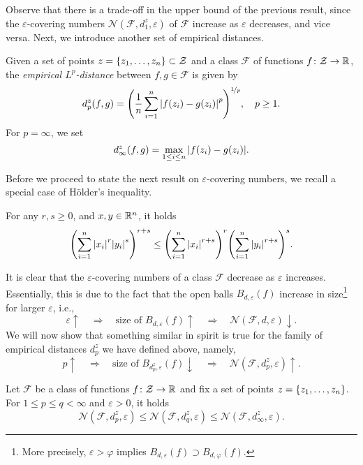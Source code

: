 Observe that there is a trade-off in the upper bound of the previous result, since the $\varepsilon$-covering numbers $\mathcal{N}(\mathcal{F}, d_1^z, \varepsilon)$ of $\mathcal{F}$ increase as $\varepsilon$ decreases, and vice versa. Next, we introduce another set of empirical distances.

\begin{definition}
Given a set of points $z = \set{z_1, \dots, z_n} \subset \mathcal{Z}$ and a class $\mathcal{F}$ of functions $f \colon \mathcal{Z} \to \mathbb{R}$, the \emph{empirical $L^p$-distance} between $f, g \in \mathcal{F}$ is given by
\[
    d_p^z(f, g) = \left(\frac{1}{n} \sum_{i=1}^n \abs{f(z_i) - g(z_i)}^p \right)^{\nicefrac{1}{p}}, \quad p \geq 1.
\]
For $p = \infty$, we set
\[
    d_{\infty}^z(f, g) = \max_{1 \leq i \leq n} \abs{f(z_i) - g(z_i)}.
\]
\end{definition}

Before we proceed to state the next result on $\varepsilon$-covering numbers, we recall a special case of H{\"o}lder's inequality.

\begin{proposition}[H{\"o}lder, 1889]
\label{prop: hoelder}
For any $r, s \geq 0$, and $x, y \in \mathbb{R}^n$, it holds
\[
    \left(\sum_{i=1}^n \abs{x_i}^r \abs{y_i}^s \right)^{r+s} \leq \left(\sum_{i=1}^n \abs{x_i}^{r+s}\right)^r \left(\sum_{i=1}^n \abs{y_i}^{r+s}\right)^s.
\]
\end{proposition}

It is clear that the $\varepsilon$-covering numbers of a class $\mathcal{F}$ decrease as $\varepsilon$ increases. Essentially, this is due to the fact that the open balls $B_{d, \varepsilon}(f)$ increase in size\footnote{More precisely, $\varepsilon > \varphi$ implies $B_{d, \varepsilon}(f) \supset B_{d, \varphi}(f)$.} for larger $\varepsilon$, i.e.,
\[
    \varepsilon \uparrow \quad \Rightarrow \quad \text{size of } B_{d, \varepsilon}(f) \uparrow \quad \Rightarrow \quad \mathcal{N}(\mathcal{F}, d, \varepsilon) \downarrow.
\]
We will now show that something similar in spirit is true for the family of empirical distances $d_p^z$ we have defined above, namely,
\[
    p \uparrow \quad \Rightarrow \quad \text{size of } B_{d_p^z, \varepsilon}(f) \downarrow \quad \Rightarrow \quad \mathcal{N}(\mathcal{F}, d_p^z, \varepsilon) \uparrow.
\]

\begin{proposition}
Let $\mathcal{F}$ be a class of functions $f \colon \mathcal{Z} \to \mathbb{R}$ and fix a set of points $z = \set{z_1, \dots, z_n}$. For $1 \leq p \leq q < \infty$ and $\varepsilon > 0$, it holds
\[
    \mathcal{N}(\mathcal{F}, d_p^z, \varepsilon) \leq \mathcal{N}(\mathcal{F}, d_q^z, \varepsilon) \leq \mathcal{N}(\mathcal{F}, d_{\infty}^z, \varepsilon).
\]
\end{proposition}

